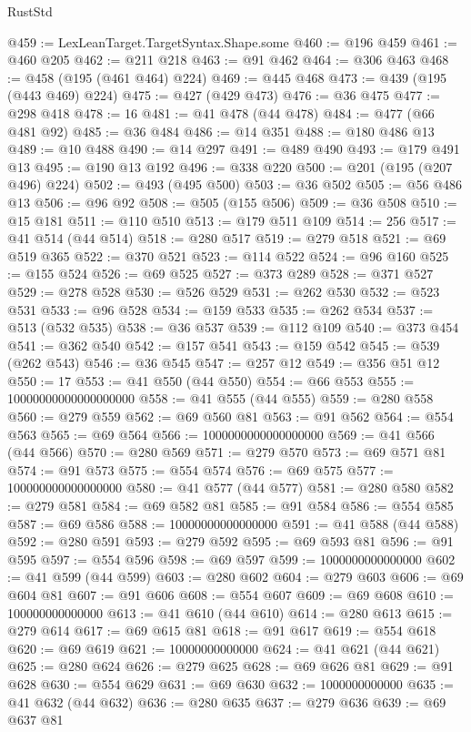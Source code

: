 \begin{lexlean}{RustStd}
\begin{coremodule}
{\begin{coremodule}
{{{{{{{{{{{{{{{{{{{{{{{{{{{{{{@459 := LexLeanTarget.TargetSyntax.Shape.some
@460 := @196 @459
@461 := @460 @205
@462 := @211 @218
@463 := @91 @462
@464 := @306 @463
@468 := @458 (@195 (@461 @464) @224)
@469 := @445 @468
@473 := @439 (@195 (@443 @469) @224)
@475 := @427 (@429 @473)
@476 := @36 @475
@477 := @298 @418
@478 := 16
@481 := @41 @478 (@44 @478)
@484 := @477 (@66 @481 @92)
@485 := @36 @484
@486 := @14 @351
@488 := @180 @486 @13
@489 := @10 @488
@490 := @14 @297
@491 := @489 @490
@493 := @179 @491 @13
@495 := @190 @13 @192
@496 := @338 @220
@500 := @201 (@195 (@207 @496) @224)
@502 := @493 (@495 @500)
@503 := @36 @502
@505 := @56 @486 @13
@506 := @96 @92
@508 := @505 (@155 @506)
@509 := @36 @508
@510 := @15 @181
@511 := @110 @510
@513 := @179 @511 @109
@514 := 256
@517 := @41 @514 (@44 @514)
@518 := @280 @517
@519 := @279 @518
@521 := @69 @519 @365
@522 := @370 @521
@523 := @114 @522
@524 := @96 @160
@525 := @155 @524
@526 := @69 @525
@527 := @373 @289
@528 := @371 @527
@529 := @278 @528
@530 := @526 @529
@531 := @262 @530
@532 := @523 @531
@533 := @96 @528
@534 := @159 @533
@535 := @262 @534
@537 := @513 (@532 @535)
@538 := @36 @537
@539 := @112 @109
@540 := @373 @454
@541 := @362 @540
@542 := @157 @541
@543 := @159 @542
@545 := @539 (@262 @543)
@546 := @36 @545
@547 := @257 @12
@549 := @356 @51 @12
@550 := 17
@553 := @41 @550 (@44 @550)
@554 := @66 @553
@555 := 10000000000000000000
@558 := @41 @555 (@44 @555)
@559 := @280 @558
@560 := @279 @559
@562 := @69 @560 @81
@563 := @91 @562
@564 := @554 @563
@565 := @69 @564
@566 := 1000000000000000000
@569 := @41 @566 (@44 @566)
@570 := @280 @569
@571 := @279 @570
@573 := @69 @571 @81
@574 := @91 @573
@575 := @554 @574
@576 := @69 @575
@577 := 100000000000000000
@580 := @41 @577 (@44 @577)
@581 := @280 @580
@582 := @279 @581
@584 := @69 @582 @81
@585 := @91 @584
@586 := @554 @585
@587 := @69 @586
@588 := 10000000000000000
@591 := @41 @588 (@44 @588)
@592 := @280 @591
@593 := @279 @592
@595 := @69 @593 @81
@596 := @91 @595
@597 := @554 @596
@598 := @69 @597
@599 := 1000000000000000
@602 := @41 @599 (@44 @599)
@603 := @280 @602
@604 := @279 @603
@606 := @69 @604 @81
@607 := @91 @606
@608 := @554 @607
@609 := @69 @608
@610 := 100000000000000
@613 := @41 @610 (@44 @610)
@614 := @280 @613
@615 := @279 @614
@617 := @69 @615 @81
@618 := @91 @617
@619 := @554 @618
@620 := @69 @619
@621 := 10000000000000
@624 := @41 @621 (@44 @621)
@625 := @280 @624
@626 := @279 @625
@628 := @69 @626 @81
@629 := @91 @628
@630 := @554 @629
@631 := @69 @630
@632 := 1000000000000
@635 := @41 @632 (@44 @632)
@636 := @280 @635
@637 := @279 @636
@639 := @69 @637 @81
}}}}}}}}}}}}}}}}}}}}}}}}}}}}}}
\end{coremodule}}
\end{coremodule}
\end{lexlean}
